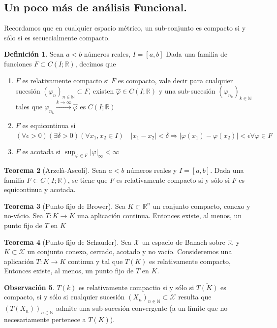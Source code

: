 \documentclass[11pt]{article}
\theoremstyle{definition} %
\newtheorem{theorem}{Teorema}[section]
\newtheorem{definition}[theorem]{Definición}
\newtheorem{remark}[theorem]{Observación}
\newcommand{\R}{\mathbb{R}}
\newcommand{\N}{\mathbb{N}}
\begin{document}
\subsection{Un poco más de análisis Funcional.}
Recordamos que en cualquier espacio métrico, un sub-conjunto es compacto si y sólo si es secuecialmente compacto.

\begin{definition}
  Sean $a<b$ números reales, $I=[a,b]$ Dada una familia de funciones $  F\subset C(I;\R)$, decimos que
  \begin{enumerate}
    \item $F$ es relativamente compacto si $\overline{F}$ es compacto, vale decir para cualquier sucesión $(\varphi_n)_{n\in \N} \subset F$, existen $\hat{\varphi} \in C(I;\R)$ y una sub-sucesión $(\varphi_{n_k})_{k\in \N}$ tales que $\varphi_{n_k} \xrightarrow{k\to \infty}\hat{\varphi}$ es $ C(I;\R)$
    \item $F$ es equicontinua si $(\forall \epsilon >0)(\exists \delta > 0)(\forall x_1,x_2 \in I) \quad |x_1-x_2|<\delta \Rightarrow |\varphi(x_1)-\varphi(x_2)|<\epsilon \forall \varphi \in F$ 
    \item $F$ es acotada si $\sup_{\varphi \in F}|\varphi|_{\infty} < \infty $ 
  \end{enumerate}
\end{definition}

\begin{theorem}[Arzelà-Ascoli] 
  Sean $a<b$ números reales y $I=[a,b]$. Dada una familia $F\subset C(I;\R)$, se tiene que $F$ es relativamente compacto si y sólo si $F$ es equicontinua y acotada.
\end{theorem}

\begin{theorem}[Punto fijo de Brower] 
  Sea $K\subset \R^n$ un conjunto compacto, conexo y no-vácio. Sea $T:K\rightarrow K$ una aplicación continua. Entonces existe, al menos, un punto fijo de $T$ en $K$
\end{theorem}

\begin{theorem}[Punto fijo de Schauder]
  Sea $\mathcal{X}$ un espacio de Banach sobre $\R$, y $K\subset \mathcal{X}$ un conjunto conexo, cerrado, acotado y no vacío. Consideremos una aplicación $T:K\rightarrow K$  continua y tal que $T(K)$ es relativamente compacto, Entonces existe, al menos, un punto fijo de $T$ en $K$.
\end{theorem}

\begin{remark}
  $T(k)$ es relativamente compactio si y sólo si $\overline{T(K)}$ es compacto, si y sólo si cualquier sucesión $(X_n)_{n\in \N}\subset \mathcal{X}$ resulta que $(T(X_n))_{n\in \N}$ admite una sub-sucesión convergente (a un límite que no necesariamente pertenece a $T(K)$).
\end{remark}
\end{document}
